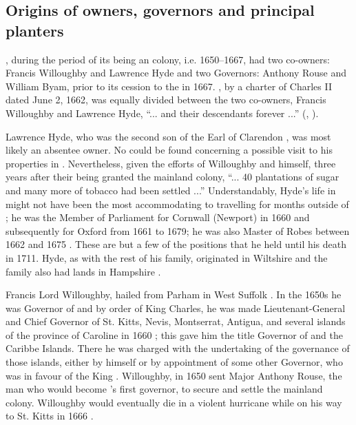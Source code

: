 \subsection{Origins of owners, governors and principal planters}\label{6.2.2}
, during the period of its being an  colony, i.e. 1650--1667, had two co-owners: Francis Willoughby and Lawrence Hyde and two Governors: Anthony Rouse and William Byam, prior to its cession to the  in 1667. , by a charter of Charles II dated June 2, 1662, was equally divided between the two co-owners, Francis Willoughby and Lawrence Hyde, ``... and their descendants forever ...'' (\citealt[no. 451]{Sainsbury80},  \citealt[429]{Griffiths97}).

Lawrence Hyde, who was the second son of the Earl of Clarendon \citep{Griffiths97}, was most likely an absentee owner. No  could be found concerning a possible visit to his properties in . Nevertheless, given the efforts of Willoughby and himself, three years after their being granted the mainland colony, ``... 40 plantations of sugar and many more of tobacco had been settled ...'' \citep[429]{Griffiths97} Understandably, Hyde's life in  might not have been the most accommodating to travelling for months outside of ; he was the Member of Parliament for Cornwall (Newport) in 1660 and subsequently for Oxford from 1661 to 1679; he was also Master of Robes between 1662 and 1675 \citep{Biographia57}. These are but a few of the positions that he held until his death in 1711. Hyde, as with the rest of his family, originated in Wiltshire and the family also had lands in Hampshire \citep{Jones62, Duke83}.

Francis Lord Willoughby, hailed from Parham in West Suffolk \citep{Burke38}. In the 1650s he was Governor of  \citep{Kaufman05} and by order of King Charles, he was made Lieutenant-General and Chief Governor of St. Kitts, Nevis, Montserrat, Antigua, and several islands of the province of Caroline in 1660 \citep{Sainsbury60}; this gave him the title Governor of  and the Caribbe Islands. There he was charged with the undertaking of the governance of those islands, either by himself or by appointment of some other Governor, who was in favour of the King \citep{Sainsbury60}. Willoughby, in 1650 sent Major Anthony Rouse, the man who would become 's first governor, to secure and settle the mainland colony. Willoughby would eventually die in a violent hurricane while on his way to St. Kitts in 1666 \citep{Pepys48}.

